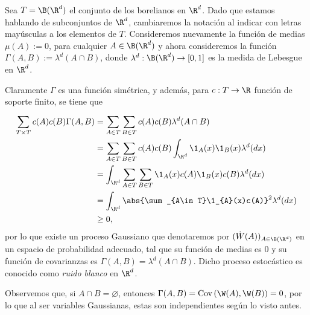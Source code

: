 \begin{ejem} 
Sea $T=\B(\R^{d})$ el conjunto de los borelianos en $\R^d$.
Dado que estamos hablando de subconjuntos de $\R^{d}$, cambiaremos la notación al indicar con letras mayúsculas a los elementos de $T$.
Consideremos nuevamente la función de medias $\mu(A):=0$, para cualquier $A\in \B(\R^{d})$ y ahora consideremos la función $\Gamma(A,B):=\lambda^{d}(A\cap B)$, donde $\lambda^{d}:\B(\R^{d})\to [0,1]$ es la medida de Lebesgue en $\R^{d}$.

 Claramente $\Gamma$ es una función simétrica, y además, para $c:T\to\R$ función de soporte finito, se tiene que 
 \begin{align*}
    \sum_{T\times T}^{}c(A)c(B)\Gamma(A,B)&=\sum_{A\in T}^{}\sum_{B\in T}c(A)c(B)\lambda^{d}(A\cap B)\\
    &=\sum_{A\in T}^{}\sum_{B\in T}c(A)c(B)\int_{\R^d}\1_{A}(x)\1_{B}(x)\lambda^{d}(dx)\\
    &=\int_{\R^{d}}\sum_{A\in T}\sum_{B\in T}\1_{A}(x)c(A)\1_{B}(x)c(B)\lambda^{d}(dx)\\
    &=\int_{\R^{d}}\abs{\sum_{A\in T}\1_{A}(x)c(A)}^2\lambda^{d}(dx)\\
    &\geq0,
    \end{align*}
por lo que existe un proceso Gaussiano que denotaremos por $(\dot{W}(A))_{A\in \B(\R^{d})}$ en un espacio de probabilidad adecuado, tal que su función de medias es $0$ y su función de covarianzas es $\Gamma(A,B)=\lambda^{d}(A\cap B)$. Dicho proceso estocástico es conocido como \textit{ruido blanco} en $\R^{d}$.

Observemos que, si $A\cap B=\varnothing$, entonces $\Gamma(A,B)=\text{Cov}\left(\W(A),\W(B)\right)=0$, por lo que al ser variables Gaussianas, estas son independientes según lo visto antes.


\end{ejem}
